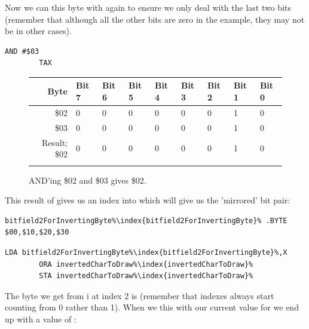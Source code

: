 Now we can  this byte with  again to ensure we only deal with the last two bits
(remember that although all the other bits are zero in the example, they may not be in other cases).

\begin{lstlisting}[escapechar=\%]
        AND #$03
        TAX
\end{lstlisting}

\begin{figure}[H]
  {
    \setlength{\tabcolsep}{3.0pt}
    \setlength\cmidrulewidth{\heavyrulewidth} %
    \begin{adjustbox}{width=10cm,center}

      \begin{tabular}{rllllllll}
        \toprule
        Byte & Bit 7 & Bit 6 & Bit 5 & Bit 4 & Bit 3 & Bit 2 & Bit 1 & Bit 0        \\
        \midrule
        \$02 & 0 & 0 & 0 & 0 & 0 & 0 & 1 & 0 \\
        \$03 & 0 & 0 & 0 & 0 & 0 & 0 & 1 & 0 \\
        \midrule
        Result; \$02 & 0 & 0 & 0 & 0 & 0 & 0 & 1 & 0 \\
        \addlinespace
        \bottomrule
      \end{tabular}

    \end{adjustbox}

  }\caption*{AND'ing \$02 and \$03 gives \$02.}
\end{figure}

This result of  gives us an index into  which will
give us the 'mirrored' bit pair:

\begin{lstlisting}[escapechar=\%]
bitfield2ForInvertingByte%\index{bitfield2ForInvertingByte}% .BYTE $00,$10,$20,$30
\end{lstlisting}
\begin{lstlisting}[escapechar=\%]
        LDA bitfield2ForInvertingByte%\index{bitfield2ForInvertingByte}%,X
        ORA invertedCharToDraw%\index{invertedCharToDraw}%
        STA invertedCharToDraw%\index{invertedCharToDraw}%
\end{lstlisting}

The byte we get from i at index 2 is  (remember that indexes
always start counting from 0 rather than 1). When we  this with our current value for
 we end up with a value of :


